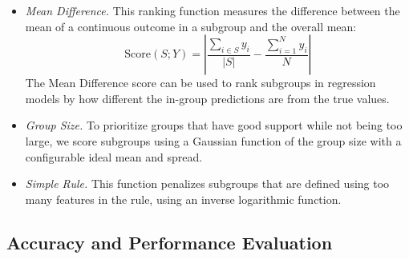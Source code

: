 \begin{itemize}[leftmargin=*]
    \item \textit{Mean Difference.} This ranking function measures the difference between the mean of a continuous outcome in a subgroup and the overall mean:
    \begin{equation}
        \text{Score}(S; Y) = \left|\frac{\sum_{i \in S} y_i}{|S|} - \frac{\sum_{i=1}^{N} y_i}{N}\right|
    \end{equation}
    The Mean Difference score can be used to rank subgroups in regression models by how different the in-group predictions are from the true values.

    \item \textit{Group Size.} To prioritize groups that have good support while not being too large, we score subgroups using a Gaussian function of the group size with a configurable ideal mean and spread.

    \item \textit{Simple Rule.} This function penalizes subgroups that are defined using too many features in the rule, using an inverse logarithmic function.
\end{itemize}

\subsection{Accuracy and Performance Evaluation}
\label{sec:performance-eval}

